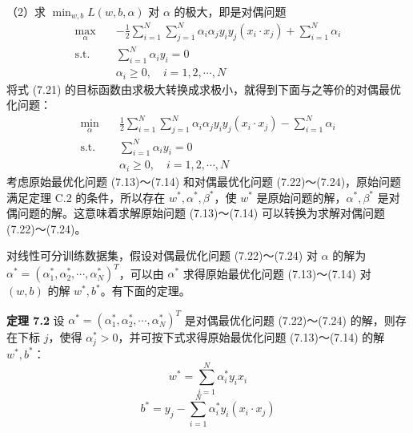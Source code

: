 \documentclass[UTF8, 12pt, fontset=fandol, oneside]{ctexart}
\begin{document}
（2）求 $\min_{w,b}L(w,b,\alpha)$ 对 $\alpha$ 的极大，即是对偶问题
\begin{equation}
\begin{aligned}
\max_\alpha\quad & -\frac{1}{2}\sum_{i=1}^N\sum_{j=1}^N\alpha_i\alpha_j y_i y_j(x_i\cdot x_j)+\sum_{i=1}^N\alpha_i\\
\mathrm{s.t.}\quad & \sum_{i=1}^N\alpha_i y_i=0\\
& \alpha_i\geq 0,\quad i=1,2,\cdots,N
\end{aligned}
\tag{7.21}
\end{equation}
将式 (7.21) 的目标函数由求极大转换成求极小，就得到下面与之等价的对偶最优化问题：
\begin{equation}
\begin{aligned}
\min_\alpha\quad & \frac{1}{2}\sum_{i=1}^N\sum_{j=1}^N\alpha_i\alpha_j y_i y_j(x_i\cdot x_j)-\sum_{i=1}^N\alpha_i\\
\mathrm{s.t.}\quad & \sum_{i=1}^N\alpha_i y_i=0\\
& \alpha_i\geq 0,\quad i=1,2,\cdots,N
\end{aligned}
\tag{7.22--7.24}
\end{equation}
考虑原始最优化问题 (7.13)～(7.14) 和对偶最优化问题 (7.22)～(7.24)，原始问题满足定理 C.2 的条件，所以存在 $w^*,\alpha^*,\beta^*$，使 $w^*$ 是原始问题的解，$\alpha^*,\beta^*$ 是对偶问题的解。这意味着求解原始问题 (7.13)～(7.14) 可以转换为求解对偶问题 (7.22)～(7.24)。

对线性可分训练数据集，假设对偶最优化问题 (7.22)～(7.24) 对 $\alpha$ 的解为 $\alpha^*=(\alpha_1^*,\alpha_2^*,\cdots,\alpha_N^*)^T$，可以由 $\alpha^*$ 求得原始最优化问题 (7.13)～(7.14) 对 $(w,b)$ 的解 $w^*,b^*$。有下面的定理。

\noindent\textbf{定理 7.2}\quad
设 $\alpha^*=(\alpha_1^*,\alpha_2^*,\cdots,\alpha_N^*)^T$ 是对偶最优化问题 (7.22)～(7.24) 的解，则存在下标 $j$，使得 $\alpha_j^*>0$，并可按下式求得原始最优化问题 (7.13)～(7.14) 的解 $w^*,b^*$：
\begin{equation}
w^*=\sum_{i=1}^N\alpha_i^* y_i x_i
\tag{7.25}
\end{equation}
\begin{equation}
b^*=y_j-\sum_{i=1}^N\alpha_i^* y_i(x_i\cdot x_j)
\tag{7.26}
\end{equation}
\end{document}
